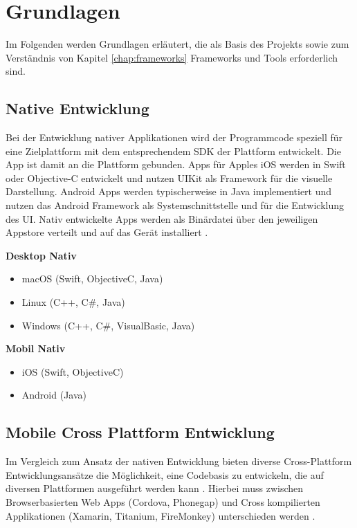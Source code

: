 
\chapter{Grundlagen}

Im Folgenden werden Grundlagen erläutert, die als Basis des Projekts sowie zum Verständnis von Kapitel \ref{chap:frameworks} Frameworks und Tools erforderlich sind.


\section{Native Entwicklung}

Bei der Entwicklung nativer Applikationen wird der Programmcode speziell für eine Zielplattform mit dem entsprechendem \ac{SDK} der Plattform entwickelt.
Die App ist damit an die Plattform gebunden. Apps für Apples iOS werden in Swift oder Objective-C entwickelt und nutzen UIKit als Framework für die visuelle Darstellung.
Android Apps werden typischerweise in Java implementiert und nutzen das Android Framework als Systemschnittstelle und für die Entwicklung des \ac{UI}.
Nativ entwickelte Apps werden als Binärdatei über den jeweiligen Appstore verteilt und auf das Gerät installiert \cite{Heitkoetter2013}.

\vspace{0.3cm}
\textbf{Desktop Nativ}
\begin{itemize}
\item macOS (Swift, ObjectiveC, Java)
\item Linux (C++, C\#, Java)
\item Windows (C++, C\#, VisualBasic, Java)
\end{itemize}
\vspace{0.3cm}

\textbf{Mobil Nativ}
\begin{itemize}
\item iOS (Swift, ObjectiveC)
\item Android (Java)
\end{itemize}
\vspace{0.3cm}

\section{Mobile Cross Plattform Entwicklung}

Im Vergleich zum Ansatz der nativen Entwicklung bieten diverse Cross-Plattform Entwicklungsansätze die Möglichkeit, eine Codebasis zu entwickeln,
die auf diversen Plattformen ausgeführt werden kann \cite{Heitkoetter2013}.
Hierbei muss zwischen Browserbasierten Web Apps (Cordova, Phonegap) und Cross kompilierten Applikationen (Xamarin, Titanium, FireMonkey) unterschieden werden
\cite{Xamar84:online}.

